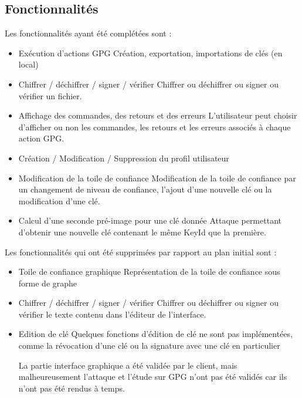 \documentclass{../res/univ-projet}
\begin{document}
  \subsection{Fonctionnalités}
    Les fonctionnalités ayant été complétées sont :\medbreak
  \begin{itemize}
  \item Exécution d'actions GPG \smallbreak
  Création, exportation, importations de clés (en local)\smallbreak
  \item Chiffrer / déchiffrer / signer / vérifier \smallbreak
  Chiffrer ou déchiffrer ou signer ou vérifier un fichier. \smallbreak
  \item Affichage des commandes, des retours et des erreurs \smallbreak
  L'utilisateur peut choisir d'afficher ou non les commandes, les retours et les erreurs associés à chaque action GPG. \smallbreak 
  \item Création / Modification / Suppression du profil utilisateur \smallbreak
  \item Modification de la toile de confiance \smallbreak
  Modification de la toile de confiance par un changement de niveau de confiance, l'ajout d'une nouvelle clé ou la modification d'une clé. \smallbreak
  \item Calcul d'une seconde pré-image pour une clé donnée \smallbreak
  Attaque permettant d'obtenir une nouvelle clé contenant le même KeyId que la première.
  \end{itemize}


  

  Les fonctionnalités qui ont été supprimées par rapport au plan initial sont :\medbreak
  \begin{itemize}
  \item Toile de confiance graphique\smallbreak
  Représentation de la toile de confiance sous forme de graphe\smallbreak
  \item Chiffrer / déchiffrer / signer / vérifier \smallbreak
  Chiffrer ou déchiffrer ou signer ou vérifier le texte contenu dans l'éditeur de l'interface.\smallbreak
  \item Edition de clé \smallbreak
  Quelques fonctions d'édition de clé ne sont pas implémentées, comme la révocation d'une clé ou la signature avec une clé en particulier \smallbreak 
  

  La partie interface graphique a été validée par le client, mais malheureusement l'attaque et l'étude sur GPG n'ont pas été validés car ils n'ont pas été rendus à temps.

  \end{itemize}
\end{document}

